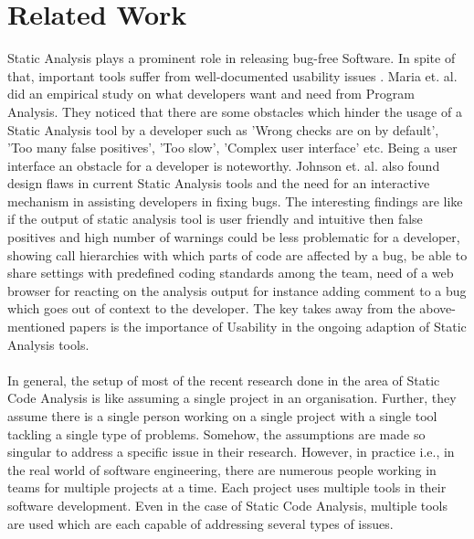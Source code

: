 \chapter{Related Work}
\label{ch:relatedwork}

Static Analysis plays a prominent role in releasing bug-free Software. In spite of that, important tools suffer from well-documented usability issues \cite{CB16,JSMB13}.  Maria et. al. \cite{CB16} did an empirical study on what developers want and need from Program Analysis. They noticed that there are some obstacles which hinder the usage of a Static Analysis tool by a developer such as 'Wrong checks are on by default', 'Too many false positives', 'Too slow',  'Complex user interface' etc. Being a user interface an obstacle for a developer is noteworthy. Johnson et. al. \cite{JSMB13} also found design flaws in current Static Analysis tools and the need for an interactive mechanism in assisting developers in fixing bugs. The interesting findings are like if the output of static analysis tool is user friendly and intuitive then false positives and high number of warnings could be less problematic for a developer, showing call hierarchies with which parts of code are affected by a bug, be able to share settings with predefined coding standards among the team, need of a web browser for reacting on the analysis output for instance adding comment to a bug which goes out of context to the developer. The key takes away from the above-mentioned papers is the importance of Usability in the ongoing adaption of Static Analysis tools. \\ \\ 

In general, the setup of most of the recent research \cite{CB16} \cite{JSMB13} done in the area of Static Code Analysis is like assuming a single project in an organisation. Further, they assume there is a single person working on a single project with a single tool tackling a single type of problems.  Somehow, the assumptions are made so singular to address a specific issue in their research. However, in practice i.e., in the real world of software engineering, there are numerous people working in teams for multiple projects at a time. Each project uses multiple tools in their software development. Even in the case of Static Code Analysis, multiple tools are used which are each capable of addressing several types of issues. \\ \\
